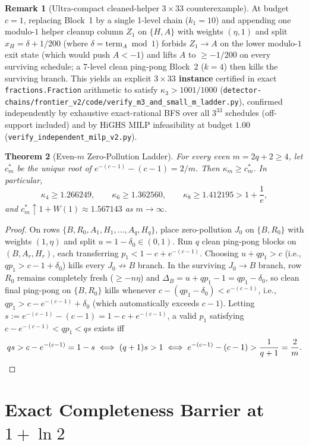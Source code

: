 \documentclass[11pt]{article}
\newtheorem{theorem}{Theorem}
\theoremstyle{definition}
\newtheorem{remark}[theorem]{Remark}
\newcommand{\disc}{\Delta}
\newcommand{\W}{W}
\begin{document}
\begin{remark}[Ultra-compact cleaned-helper $3\times 33$ counterexample]
At budget $c=1$, replacing Block~1 by a single 1-level chain ($k_1=10$) and appending one modulo-$1$ helper cleanup column $Z_1$ on $\{H,A\}$ with weights $(\eta,1)$ and split $x_H=\delta+1/200$ (where $\delta=\mathrm{term}_A\bmod 1$) forbids $Z_1\to A$ on the lower modulo-$1$ exit state (which would push $A<-1$) and lifts $A$ to $\ge -1/200$ on every surviving schedule; a 7-level clean ping-pong Block~2 ($k=4$) then kills the surviving branch. This yields an explicit \textbf{$3\times 33$ instance} certified in exact \texttt{fractions.Fraction} arithmetic to satisfy $\kappa_3>1001/1000$ (\texttt{detector-chains/frontier\_v2/code/verify\_m3\_and\_small\_m\_ladder.py}), confirmed independently by exhaustive exact-rational BFS over all $3^{33}$ schedules (off-support included) and by HiGHS MILP infeasibility at budget $1.00$ (\texttt{verify\_independent\_milp\_v2.py}).
\end{remark}

\begin{theorem}[Even-$m$ Zero-Pollution Ladder]\label{thm:ladder}
For every even $m=2q+2\ge 4$, let $c_m^*$ be the unique root of $e^{-(c-1)}-(c-1)=2/m$. Then $\kappa_m\ge c_m^*$. In particular,
\[
 \kappa_4\ge 1.266249,\qquad \kappa_6\ge 1.362560,\qquad \kappa_8\ge 1.412195 > 1+\frac{1}{e},
\]
and $c_m^*\uparrow 1+\W(1)\approx 1.567143$ as $m\to\infty$.
\end{theorem}
\begin{proof}
On rows $\{B,R_0,A_1,H_1,\dots,A_q,H_q\}$, place zero-pollution $J_0$ on $\{B,R_0\}$ with weights $(1,\eta)$ and split $u=1-\delta_0\in(0,1)$. Run $q$ clean ping-pong blocks on $(B,A_r,H_r)$, each transferring $p_1<1-c+e^{-(c-1)}$. Choosing $u+qp_1>c$ (i.e., $qp_1>c-1+\delta_0$) kills every $J_0\not\to B$ branch. In the surviving $J_0\to B$ branch, row $R_0$ remains completely fresh ($\ge -n\eta$) and $\disc_B=u+qp_1-1=qp_1-\delta_0$, so clean final ping-pong on $\{B,R_0\}$ kills whenever $c-(qp_1-\delta_0)<e^{-(c-1)}$, i.e., $qp_1>c-e^{-(c-1)}+\delta_0$ (which automatically exceeds $c-1$). Letting $s:=e^{-(c-1)}-(c-1)=1-c+e^{-(c-1)}$, a valid $p_1$ satisfying $c-e^{-(c-1)}<qp_1<qs$ exists iff
\[
 qs > c - e^{-(c-1)} = 1 - s \iff (q+1)s > 1 \iff e^{-(c-1)}-(c-1) > \frac{1}{q+1} = \frac{2}{m}. \qedhere
\]
\end{proof}

\section{Exact Completeness Barrier at $1+\ln 2$}
\end{document}

